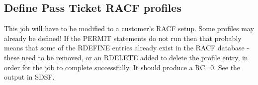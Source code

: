 \documentclass[letterpaper,10pt,english]{sphinxmanual}
\begin{document}
\subsection{Define Pass Ticket RACF profiles}
\label{\detokenize{connectivity_guide:define-pass-ticket-racf-profiles}}
This job will have to be modified to a customer’s RACF setup. Some profiles may already be defined! If the PERMIT statements do not run then that probably means that some of the RDEFINE entries already exist in the RACF database - these need to be removed, or an RDELETE added to delete the profile entry, in order for the job to complete successfully. It should produce a RC=0. See the output in SDSF.

\begin{sphinxVerbatim}[commandchars=\\\{\}]
  
  
  
         
         
         
         
          
          \PYGZbs{} 
            
            
         \PYGZbs{}   
          
          
\end{sphinxVerbatim}
\end{document}
